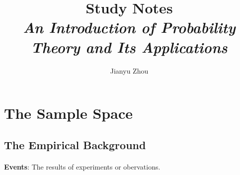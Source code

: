 \documentclass{article}
\author{Jianyu Zhou}
\title{\textbf{Study Notes}\\ \textit{An Introduction of Probability Theory and Its Applications}}
\begin{document}
	\maketitle
	\section{The Sample Space}
	\subsection{The Empirical Background}
	\paragraph{} \textbf{Events}: The results of experiments or obervations.
	
\end{document}
